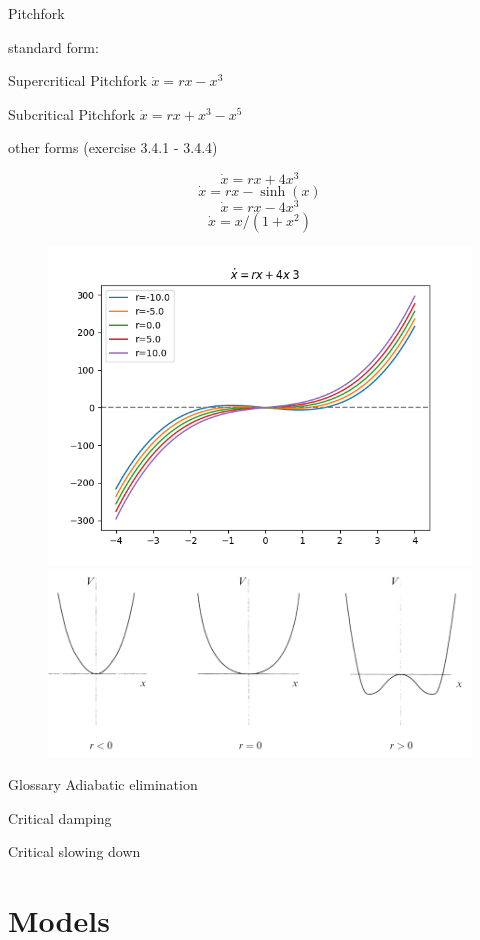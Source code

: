 \documentclass[9pt,aspectratio=43,mathserif,table]{beamer}
\begin{document}
\begin{frame}{Pitchfork}

  \begin{multicols}{2}
  standard form:

  \quad Supercritical Pitchfork  $\dot x = rx - x ^3$

  \quad Subcritical Pitchfork $\dot x = rx + x^3 - x^5$

  other forms (exercise 3.4.1 - 3.4.4)

   $$ \dot x = rx + 4 x ^ 3 $$
   $$ \dot x = rx - \sinh(x) $$
   $$ \dot x = rx - 4 x ^ 3 $$
   $$ \dot x = x / ( 1 + x ^ 2 ) $$

    \begin{figure}[!h]
      \centering
      \includegraphics[width=.5\textwidth]{fig/pitchfork.png}
      \includegraphics[width=.5\textwidth]{fig/pitchfork_potential.png}
      \caption{}
    \end{figure}
 
  \end{multicols}
\end{frame}
\begin{frame}{Glossary}
Adiabatic elimination

Critical damping

Critical slowing down


\end{frame}




\section{Models}
\end{document}
